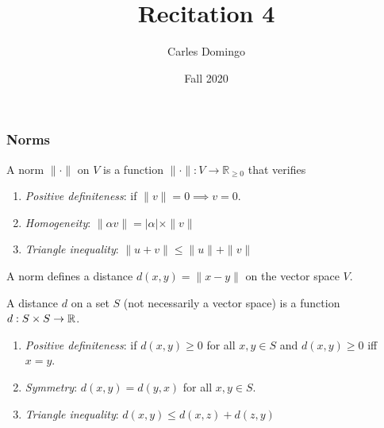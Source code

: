 \documentclass{beamer}
\title{Recitation 4}
\author{Carles Domingo}
\date{Fall 2020}
\begin{document}
\frame{\titlepage} 

\setcounter{showProgressBar}{0}
\setcounter{showSlideNumbers}{1}

\begin{frame}[t]
\frametitle{Norms}
\begin{definition}[Norm]
	A norm $\| \cdot \|$ on $V$ is a function $\| \cdot \| : V \rightarrow \mathbb{R}_{\geq 0}$ that verifies
	\begin{enumerate}
		\item \emph{Positive definiteness}: if $\|v\| = 0 \implies v=0$. \hfill
		\item \emph{Homogeneity}: $\| \alpha v \| = |\alpha|\times \| v\|$ \hfill 
		\item \emph{Triangle inequality}: $\|u + v\| \leq \|u\| + \|v\|$ \hfill 
	\end{enumerate}
\end{definition}
A norm defines a distance $d(x,y) = \|x-y\|$ on the vector space $V$.
\begin{definition}[Distance]
	A distance $d$ on a set $S$ (not necessarily a vector space) is a function $d : S \times S \rightarrow \mathbb{R}$.
	\begin{enumerate}
		\item \emph{Positive definiteness}: if $d(x,y) \geq 0$ for all $x,y \in S$ and $d(x,y) \geq 0$ iff $x = y$. \hfill
		\item \emph{Symmetry}: $d(x,y) = d(y,x)$ for all $x, y \in S$. \hfill 
		\item \emph{Triangle inequality}: $d(x,y) \leq d(x,z) + d(z,y)$ \hfill 
	\end{enumerate}
\end{definition}
\end{frame}
\end{document}
